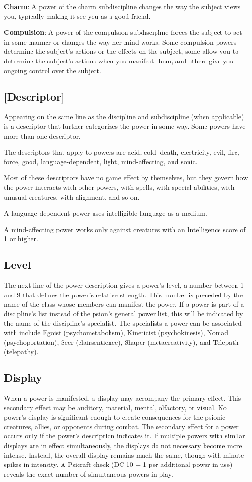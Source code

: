 \textbf{Charm}: A power of the charm subdiscipline changes the way the subject views you, typically making it see you as a good friend.

\textbf{Compulsion}: A power of the compulsion subdiscipline forces the subject to act in some manner or changes the way her mind works. Some compulsion powers determine the subject's actions or the effects on the subject, some allow you to determine the subject's actions when you manifest them, and others give you ongoing control over the subject.

\subsection{[Descriptor]}
Appearing on the same line as the discipline and subdiscipline (when applicable) is a descriptor that further categorizes the power in some way. Some powers have more than one descriptor.

The descriptors that apply to powers are acid, cold, death, electricity, evil, fire, force, good, language-dependent, light, mind-affecting, and sonic.

Most of these descriptors have no game effect by themselves, but they govern how the power interacts with other powers, with spells, with special abilities, with unusual creatures, with alignment, and so on.

A language-dependent power uses intelligible language as a medium.

A mind-affecting power works only against creatures with an Intelligence score of 1 or higher.

\subsection{Level}
The next line of the power description gives a power's level, a number between 1 and 9 that defines the power's relative strength. This number is preceded by the name of the class whose members can manifest the power. If a power is part of a discipline's list instead of the psion's general power list, this will be indicated by the name of the discipline's specialist. The specialists a power can be associated with include Egoist (psychometabolism), Kineticist (psychokinesis), Nomad (psychoportation), Seer (clairsentience), Shaper (metacreativity), and Telepath (telepathy).

\subsection{Display}
When a power is manifested, a display may accompany the primary effect. This secondary effect may be auditory, material, mental, olfactory, or visual. No power's display is significant enough to create consequences for the psionic creatures, allies, or opponents during combat. The secondary effect for a power occurs only if the power's description indicates it. If multiple powers with similar displays are in effect simultaneously, the displays do not necessary become more intense. Instead, the overall display remains much the same, though with minute spikes in intensity. A Psicraft check (DC 10 + 1 per additional power in use) reveals the exact number of simultaneous powers in play.

